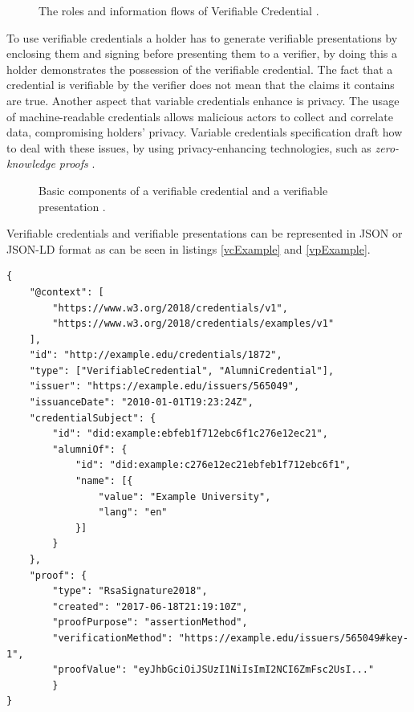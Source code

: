\begin{figure}[h!]
    \centering
    
    \caption{The roles and information flows of Verifiable Credential \cite{vcW3C}.}
    \label{vcEcosystem}
\end{figure}

To use verifiable credentials a holder has to generate verifiable presentations by enclosing them and signing before presenting them to a verifier, by doing this a holder demonstrates the possession of the verifiable credential. The fact that a credential is verifiable by the verifier does not mean that the claims it contains are true. Another aspect that variable credentials enhance is privacy. The usage of machine-readable credentials allows malicious actors to collect and correlate data, compromising holders' privacy. Variable credentials specification draft how to deal with these issues, by using privacy-enhancing technologies, such as \textit{zero-knowledge proofs} \cite{zkp-survey}. 

\begin{figure}[h!]
    \centering
     
    \hfil
    
    \caption{Basic components of a verifiable credential and a verifiable presentation \cite{vcW3C}.}
    \label{vc-vp-topview}
\end{figure}

Verifiable credentials and verifiable presentations can be represented in JSON \cite{json-rfc3986} or JSON-LD \cite{json-ld} format as can be seen in listings \ref{vcExample} and \ref{vpExample}. \\

\begin{lstlisting}[caption={A simple example of a verifiable credential \cite{vcW3C}.},captionpos=b,style=json, label={vcExample},breaklines=true,frame=single]
{
    "@context": [
        "https://www.w3.org/2018/credentials/v1",
        "https://www.w3.org/2018/credentials/examples/v1"
    ],
    "id": "http://example.edu/credentials/1872",
    "type": ["VerifiableCredential", "AlumniCredential"],
    "issuer": "https://example.edu/issuers/565049",
    "issuanceDate": "2010-01-01T19:23:24Z",
    "credentialSubject": {
        "id": "did:example:ebfeb1f712ebc6f1c276e12ec21",
        "alumniOf": {
            "id": "did:example:c276e12ec21ebfeb1f712ebc6f1",
            "name": [{
                "value": "Example University",
                "lang": "en"
            }]
        }
    },    
    "proof": {
        "type": "RsaSignature2018",
        "created": "2017-06-18T21:19:10Z",
        "proofPurpose": "assertionMethod",
        "verificationMethod": "https://example.edu/issuers/565049#key-1",
        "proofValue": "eyJhbGciOiJSUzI1NiIsImI2NCI6ZmFsc2UsI..."
        }
}
\end{lstlisting}


